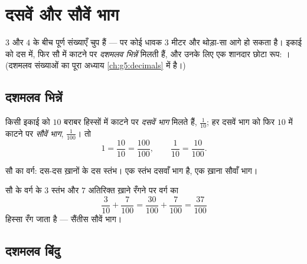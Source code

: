 \chapter{दसवें और सौवें भाग}\label{ch:g4:decimals}

$3$ और $4$ के बीच पूर्ण संख्याएँ चुप हैं --- पर कोई धावक $3$
मीटर और थोड़ा-सा आगे हो सकता है। इकाई को दस में, फिर सौ में
काटने पर \emph{दशमलव भिन्नें} मिलती हैं, और उनके लिए एक शानदार
छोटा रूप: । (दशमलव संख्याओं का पूरा अध्याय
\cref{ch:g5:decimals} में है।)

\section{दशमलव भिन्नें}

\begin{definition}[दसवें और सौवें भाग]\label{def:g4:decimals:def}
किसी इकाई को $10$ बराबर हिस्सों में काटने पर \emph{दसवें भाग}
मिलते हैं, $\frac{1}{10}$; हर दसवें भाग को फिर $10$ में काटने पर
\emph{सौवें भाग}, $\frac{1}{100}$। तो
\[
1 = \frac{10}{10} = \frac{100}{100},
\qquad
\frac{1}{10} = \frac{10}{100}.
\]
\end{definition}

\begin{omfigure}

{\small सौ का वर्ग: दस-दस ख़ानों के दस स्तंभ। एक स्तंभ दसवाँ
भाग है, एक ख़ाना सौवाँ भाग।}
\end{omfigure}

\begin{example}\label{ex:g4:decimals:count}
सौ के वर्ग के $3$ स्तंभ और $7$ अतिरिक्त ख़ाने रँगने पर वर्ग का
\[
\frac{3}{10} + \frac{7}{100} = \frac{30}{100} + \frac{7}{100}
= \frac{37}{100}
\]
हिस्सा रँग जाता है --- सैंतीस सौवें भाग।
\end{example}

\section{दशमलव बिंदु}

